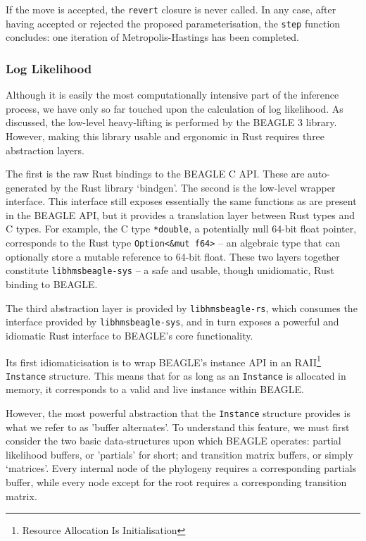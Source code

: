 \documentclass[10pt,journal,compsoc]{IEEEtran}
\begin{document}
If the move is accepted, the \texttt{revert} closure is never called. In any case, after having accepted or rejected the proposed parameterisation, the \texttt{step} function concludes: one iteration of Metropolis-Hastings has been completed.


\subsubsection{Log Likelihood}
  
Although it is easily the most computationally intensive part of the inference process, we have only so far touched upon the calculation of log likelihood. As discussed, the low-level heavy-lifting is performed by the BEAGLE 3 library. However, making this library usable and ergonomic in Rust requires three abstraction layers.

The first is the raw Rust bindings to the BEAGLE C API. These are auto-generated by the Rust library `bindgen'. The second is the low-level wrapper interface. This interface still exposes essentially the same functions as are present in the BEAGLE API, but it provides a translation layer between Rust types and C types. For example, the C type \texttt{*double}, a potentially null 64-bit float pointer, corresponds to the Rust type \texttt{Option<\&mut f64>} -- an algebraic type that can optionally store a mutable reference to 64-bit float. These two layers together constitute \texttt{libhmsbeagle-sys} -- a safe and usable, though unidiomatic, Rust binding to BEAGLE.

The third abstraction layer is provided by \texttt{libhmsbeagle-rs}, which consumes the interface provided by \texttt{libhmsbeagle-sys}, and in turn exposes a powerful and idiomatic Rust interface to BEAGLE's core functionality.

Its first idiomaticisation is to wrap BEAGLE's instance API in an RAII\footnote{Resource Allocation Is Initialisation} \texttt{Instance} structure. This means that for as long as an \texttt{Instance} is allocated in memory, it corresponds to a valid and live instance within BEAGLE.

However, the most powerful abstraction that the \texttt{Instance} structure provides is what we refer to as 'buffer alternates'. To understand this feature, we must first consider the two basic data-structures upon which BEAGLE operates: partial likelihood buffers, or 'partials' for short; and transition matrix buffers, or simply `matrices'. Every internal node of the phylogeny requires a corresponding partials buffer, while every node except for the root requires a corresponding transition matrix.
\end{document}
